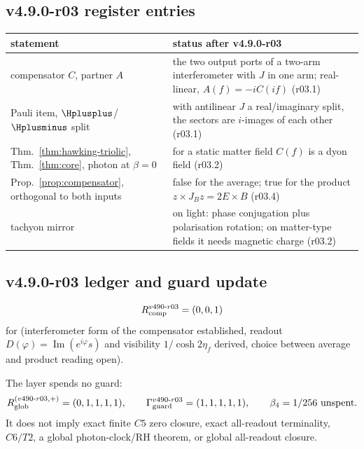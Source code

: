 \subsection*{v4.9.0-r03 register entries}
\label{subsec:v490-r03-register}

\begin{center}
\small
\begin{tabular}{@{}>{\raggedright\arraybackslash}p{}>{\raggedright\arraybackslash}p{}@{}}
\toprule
statement & status after v4.9.0-r03\\
\midrule
compensator \(C\), partner \(A\) & the two output ports of a two-arm interferometer with \(J\) in one arm; real-linear, \(A(f)=-iC(if)\) (r03.1)\\
Pauli item, \(\Hplusplus\)/\(\Hplusminus\) split & with antilinear \(J\) a real/imaginary split, the sectors are \(i\)-images of each other (r03.1)\\
Thm.~\ref{thm:hawking-triolic}, Thm.~\ref{thm:core}, photon at \(\beta=0\) & for a static matter field \(C(f)\) is a dyon field (r03.2)\\
Prop.~\ref{prop:compensator}, orthogonal to both inputs & false for the average; true for the product \(z\times J_Bz=2E\times B\) (r03.4)\\
tachyon mirror & on light: phase conjugation plus polarisation rotation; on matter-type fields it needs magnetic charge (r03.2)\\
\bottomrule
\end{tabular}
\end{center}

\subsection*{v4.9.0-r03 ledger and guard update}
\label{subsec:v490-r03-ledger-guard}

\[
R_{\rm comp}^{v490\text{-}r03}=(0,0,1)
\]
for (interferometer form of the compensator established, readout \(D(\varphi)=\operatorname{Im}(e^{i\varphi}s)\) and
visibility \(1/\cosh2\eta_f\) derived, choice between average and product reading open).

The layer spends no guard:
\[
R_{\rm glob}^{(v490\text{-}r03,+)}=(0,1,1,1,1),
\qquad
\Gamma_{\rm guard}^{v490\text{-}r03}=(1,1,1,1,1),
\qquad
\beta_4=1/256\ \text{unspent}.
\]
It does not imply exact finite \(C5\) zero closure, exact all-readout terminality,
\(C6/T2\), a global photon-clock/RH theorem, or global all-readout closure.

